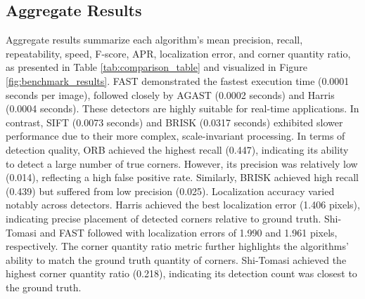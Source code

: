 \documentclass[journal]{IEEEtran}
\begin{document}
\subsection{Aggregate Results}
Aggregate results summarize each algorithm’s mean precision, recall, repeatability, speed, F-score, APR, localization error, and corner quantity ratio, as presented in Table \ref{tab:comparison_table} and visualized in Figure \ref{fig:benchmark_results}. FAST demonstrated the fastest execution time (0.0001 seconds per image), followed closely by AGAST (0.0002 seconds) and Harris (0.0004 seconds). These detectors are highly suitable for real-time applications. In contrast, SIFT (0.0073 seconds) and BRISK (0.0317 seconds) exhibited slower performance due to their more complex, scale-invariant processing. In terms of detection quality, ORB achieved the highest recall (0.447), indicating its ability to detect a large number of true corners. However, its precision was relatively low (0.014), reflecting a high false positive rate. Similarly, BRISK achieved high recall (0.439) but suffered from low precision (0.025). Localization accuracy varied notably across detectors. Harris achieved the best localization error (1.406 pixels), indicating precise placement of detected corners relative to ground truth. Shi-Tomasi and FAST followed with localization errors of 1.990 and 1.961 pixels, respectively. The corner quantity ratio metric further highlights the algorithms' ability to match the ground truth quantity of corners. Shi-Tomasi achieved the highest corner quantity ratio (0.218), indicating its detection count was closest to the ground truth.
\end{document}
